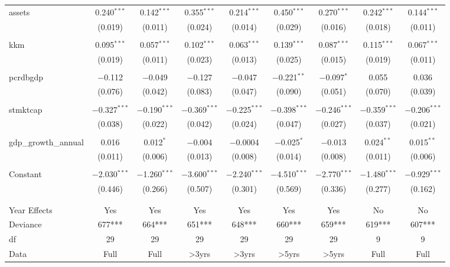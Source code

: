 \documentclass[a4paper,nobind]{templates/ociamthesis}
\begin{document}
\begin{landscape}
\begin{table}[!htbp]
\begin{tabular}{@{\extracolsep{5pt}}lcccccccc}
 assets & 0.240$^{***}$ & 0.142$^{***}$ & 0.355$^{***}$ & 0.214$^{***}$ & 0.450$^{***}$ & 0.270$^{***}$ & 0.242$^{***}$ & 0.144$^{***}$ \\ 
  & (0.019) & (0.011) & (0.024) & (0.014) & (0.029) & (0.016) & (0.018) & (0.011) \\ 
  & & & & & & & & \\ 
 kkm & 0.095$^{***}$ & 0.057$^{***}$ & 0.102$^{***}$ & 0.063$^{***}$ & 0.139$^{***}$ & 0.087$^{***}$ & 0.115$^{***}$ & 0.067$^{***}$ \\ 
  & (0.019) & (0.011) & (0.023) & (0.013) & (0.025) & (0.015) & (0.019) & (0.011) \\ 
  & & & & & & & & \\ 
 pcrdbgdp & $-$0.112 & $-$0.049 & $-$0.127 & $-$0.047 & $-$0.221$^{**}$ & $-$0.097$^{*}$ & 0.055 & 0.036 \\ 
  & (0.076) & (0.042) & (0.083) & (0.047) & (0.090) & (0.051) & (0.070) & (0.039) \\ 
  & & & & & & & & \\ 
 stmktcap & $-$0.327$^{***}$ & $-$0.190$^{***}$ & $-$0.369$^{***}$ & $-$0.225$^{***}$ & $-$0.398$^{***}$ & $-$0.246$^{***}$ & $-$0.359$^{***}$ & $-$0.206$^{***}$ \\ 
  & (0.038) & (0.022) & (0.042) & (0.024) & (0.047) & (0.027) & (0.037) & (0.021) \\ 
  & & & & & & & & \\ 
 gdp\_growth\_annual & 0.016 & 0.012$^{*}$ & $-$0.004 & $-$0.0004 & $-$0.025$^{*}$ & $-$0.013 & 0.024$^{**}$ & 0.015$^{**}$ \\ 
  & (0.011) & (0.006) & (0.013) & (0.008) & (0.014) & (0.008) & (0.011) & (0.006) \\ 
  & & & & & & & & \\ 
 Constant & $-$2.030$^{***}$ & $-$1.260$^{***}$ & $-$3.600$^{***}$ & $-$2.240$^{***}$ & $-$4.510$^{***}$ & $-$2.770$^{***}$ & $-$1.480$^{***}$ & $-$0.929$^{***}$ \\ 
  & (0.446) & (0.266) & (0.507) & (0.301) & (0.569) & (0.336) & (0.277) & (0.162) \\ 
  & & & & & & & & \\ 
\hline \\[-1.8ex] 
Year Effects & Yes & Yes & Yes & Yes & Yes & Yes & No & No \\ 
Deviance & 677*** & 664*** & 651*** & 648*** & 660*** & 659*** & 619*** & 607*** \\ 
df & 29 & 29 & 29 & 29 & 29 & 29 & 9 & 9 \\ 
Data & Full & Full & >3yrs & >3yrs & >5yrs & >5yrs & Full & Full \\ 

\end{tabular}
\end{table}
\end{landscape}
\end{document}
